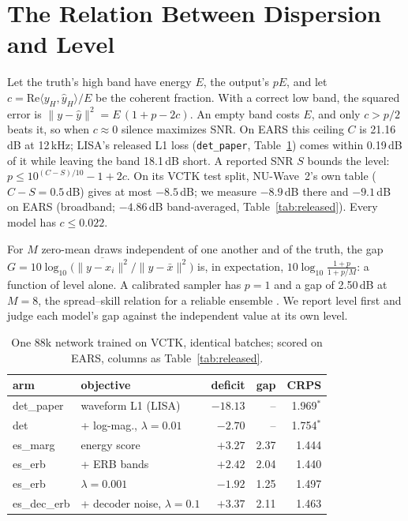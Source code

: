 \documentclass[letterpaper]{article} %
\begin{document}
\section{The Relation Between Dispersion and Level}
Let the truth's high band have energy $E$, the output's $pE$, and let
$c=\mathrm{Re}\langle y_H,\hat y_H\rangle/E$ be the coherent fraction. With a correct low band, the squared
error is $\|y-\hat y\|^2=E\,(1+p-2c)$. An empty band costs $E$, and only $c>p/2$ beats it, so when
$c\approx0$ silence maximizes SNR. On EARS this ceiling $C$ is 21.16\,dB at 12\,kHz; LISA's released L1 loss
(\texttt{det\_paper}, Table~\ref{tab:arms}) comes within 0.19\,dB of it while leaving the band 18.1\,dB
short. A reported SNR $S$ bounds the level: $p\le10^{(C-S)/10}-1+2c$. On its VCTK test split, NU-Wave~2's
own table ($C-S=0.5$\,dB) gives at most $-8.5$\,dB; we measure $-8.9$\,dB there and $-9.1$\,dB on EARS
(broadband; $-4.86$\,dB band-averaged, Table~\ref{tab:released}). Every model has $c\le0.022$.

For $M$ zero-mean draws independent of one another and of the truth, the gap
$G=10\log_{10}\bigl(\overline{\|y-x_i\|^2}/\|y-\bar x\|^2\bigr)$ is, in expectation,
$10\log_{10}\frac{1+p}{1+p/M}$: a function of level alone. A calibrated sampler has $p=1$ and a gap of
2.50\,dB at $M=8$, the spread--skill relation for a reliable ensemble \citep{fortin2014}. We report level
first and judge each model's gap against the independent value at its own level.

\begin{table}[t]
\centering\small\setlength{\tabcolsep}{4pt}
\begin{tabular}{llrrr}
\toprule
arm & objective & deficit & gap & CRPS \\
\midrule
det\_paper & waveform L1 (LISA) & $-18.13$ & -- & 1.969$^*$ \\
det & + log-mag., $\lambda{=}0.01$ & $-2.70$ & -- & 1.754$^*$ \\
es\_marg & energy score & $+3.27$ & 2.37 & 1.444 \\
es\_erb & + ERB bands & $+2.42$ & 2.04 & 1.440 \\
es\_erb & $\lambda{=}0.001$ & $-1.92$ & 1.25 & 1.497 \\
es\_dec\_erb & + decoder noise, $\lambda{=}0.1$ & $+3.37$ & 2.11 & 1.463 \\
\bottomrule
\end{tabular}
\caption{One 88k network trained on VCTK, identical batches; scored on EARS, columns as
Table~\ref{tab:released}.}
\label{tab:arms}
\end{table}
\end{document}
